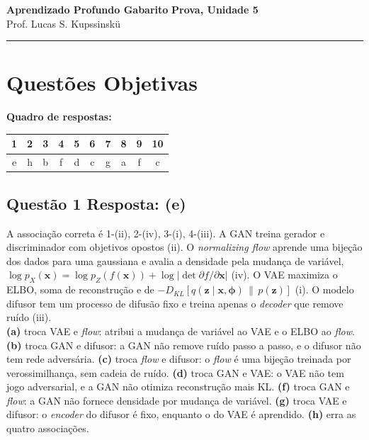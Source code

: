\documentclass[11pt,a4paper]{article}
\begin{document}
{\Large\bfseries Aprendizado Profundo \textemdash{} Gabarito} \hfill \textbf{Prova, Unidade 5}\\
Prof. Lucas S. Kupssinskü

\rule{\linewidth}{0.8pt}

\section*{Questões Objetivas}

\textbf{Quadro de respostas:}
\begin{center}
\begin{tabular}{|c|c|c|c|c|c|c|c|c|c|}
\hline
1 & 2 & 3 & 4 & 5 & 6 & 7 & 8 & 9 & 10 \\\hline
e & h & b & f & d & c & g & a & f & c \\\hline
\end{tabular}
\end{center}

\color{blue}

\subsection*{Questão 1 \textemdash{} Resposta: (e)}
A associação correta é 1-(ii), 2-(iv), 3-(i), 4-(iii). A GAN treina gerador e discriminador com objetivos opostos (ii). O \textit{normalizing flow} aprende uma bijeção dos dados para uma gaussiana e avalia a densidade pela mudança de variável, $\log p_X(\mathbf{x}) = \log p_Z(f(\mathbf{x})) + \log\left|\det \partial f/\partial \mathbf{x}\right|$ (iv). O VAE maximiza o ELBO, soma de reconstrução e de $-D_{KL}[q(\mathbf{z}\mid\mathbf{x},\boldsymbol{\phi})\,\|\,p(\mathbf{z})]$ (i). O modelo difusor tem um processo de difusão fixo e treina apenas o \textit{decoder} que remove ruído (iii).\\
\textbf{(a)} troca VAE e \textit{flow}: atribui a mudança de variável ao VAE e o ELBO ao \textit{flow}.
\textbf{(b)} troca GAN e difusor: a GAN não remove ruído passo a passo, e o difusor não tem rede adversária.
\textbf{(c)} troca \textit{flow} e difusor: o \textit{flow} é uma bijeção treinada por verossimilhança, sem cadeia de ruído.
\textbf{(d)} troca GAN e VAE: o VAE não tem jogo adversarial, e a GAN não otimiza reconstrução mais KL.
\textbf{(f)} troca GAN e \textit{flow}: a GAN não fornece densidade por mudança de variável.
\textbf{(g)} troca VAE e difusor: o \textit{encoder} do difusor é fixo, enquanto o do VAE é aprendido.
\textbf{(h)} erra as quatro associações.
\end{document}
